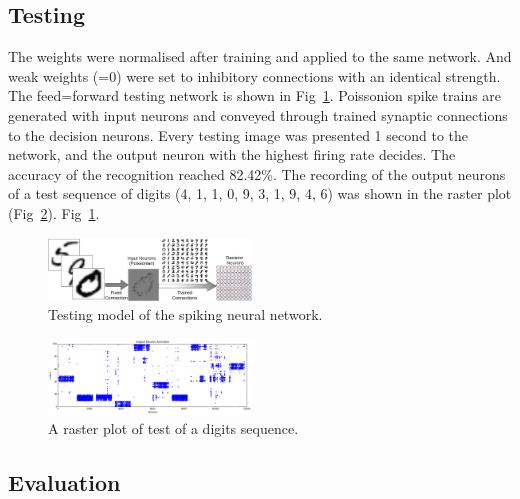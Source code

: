 \subsection{Testing}
The weights were normalised after training and applied to the same network.
And weak weights (=0) were set to inhibitory connections with an identical strength.
The feed=forward testing network is shown in Fig~\ref{Fig:test}.
Poissonion spike trains are generated with input neurons and conveyed through trained synaptic connections to the decision neurons.
Every testing image was presented 1 second to the network, and the output neuron with the highest firing rate decides.
The accuracy of the recognition reached 82.42\%.%
The recording of the output neurons of a test sequence of digits (4, 1, 1, 0, 9, 3, 1, 9, 4, 6) was shown in the raster plot (Fig~\ref{Fig:output}).
Fig~\ref{Fig:test}.
\begin{figure}[hbt!]
	\centering
	\includegraphics[width=0.48\textwidth]{images/testing.pdf}
	\caption{Testing model of the spiking neural network.}
	\label{Fig:test}
\end{figure} 
\begin{figure}[hbt!]
	\centering
	\includegraphics[width=0.48\textwidth]{images/test300-301.pdf}
	\caption{A raster plot of test of a digits sequence.}
	\label{Fig:output}
\end{figure} 
\subsection{Evaluation}

	
